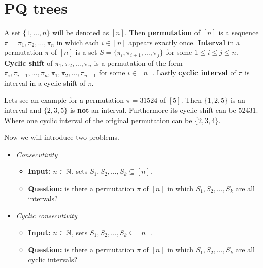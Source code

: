 \chapter{PQ trees}

\begin{notation}
	A set $\{1, \dots, n\}$ will be denoted as $[n]$. Then \textbf{permutation} of $[n]$ is a sequence $\pi = \pi_1, \pi_2, \dots, \pi_n$ in which each $i \in [n]$ appears exactly once. \textbf{Interval} in a permutation $\pi$ of $[n]$ is a set $S = \{\pi_i, \pi_{i+1}, \dots, \pi_j\}$ for some $1 \leq i \leq j \leq n$. \textbf{Cyclic shift} of $\pi_1, \pi_2, \dots, \pi_n$ is a permutation of the form $\pi_i, \pi_{i+1}, \dots, \pi_n, \pi_1, \pi_2, \dots, \pi_{n-1}$ for some $i \in [n]$. Lastly \textbf{cyclic interval} of $\pi$ is interval in a cyclic shift of $\pi$.
\end{notation}

\begin{example}
	Lets see an example for a permutation $\pi = 31524$ of $[5]$. Then $\{1,2,5\}$ is an interval and $\{2,3,5\}$ is \textbf{not} an interval. Furthermore its cyclic shift can be $52431$. Where one cyclic interval of the original permutation can be $\{2,3,4\}$.
\end{example}

Now we will introduce two problems.

\begin{mybox}
	
\end{mybox}

\begin{itemize}[]
	\item \textit{Consecutivity}
	
	\begin{itemize}[]
		\item \textbf{Input:} $n \in \mathbb{N}$, sets $S_1, S_2, \dots, S_k \subseteq [n]$.
		\item \textbf{Question:} is there a permutation $\pi$ of $[n]$ in which $S_1, S_2, \dots, S_k$ are all intervals?
	\end{itemize}
	
	\item \textit{Cyclic consecutivity}
	
	\begin{itemize}[]
		\item \textbf{Input:} $n \in \mathbb{N}$, sets $S_1, S_2, \dots, S_k \subseteq [n]$.
		\item \textbf{Question:} is there a permutation $\pi$ of $[n]$ in which $S_1, S_2, \dots, S_k$ are all cyclic intervals?
	\end{itemize}
\end{itemize}

